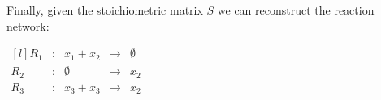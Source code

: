 \documentclass[]{scrartcl}
\begin{document}
\vspace{12pt}
Finally, given the stoichiometric matrix $S$ we can reconstruct the reaction network: 
\vspace{12pt}


\begin{center}
\noindent \begin{minipage}{.4\linewidth}
$
\begin{matrix*}[l]
	R_1 & : & x_1 + x_2 & \rightarrow & \emptyset \\
	R_2 & : & \emptyset & \rightarrow & x_2 \\
	R_3 & : & x_3 + x_3 & \rightarrow & x_2
\end{matrix*}
$
\end{minipage}
\end{center}
\end{document}
